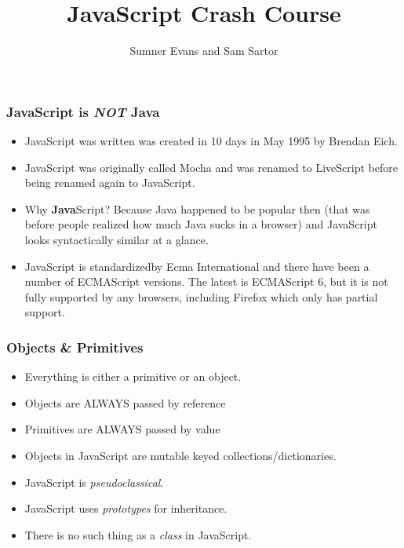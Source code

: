 \documentclass{lug}
\title{JavaScript Crash Course}
\author{Sumner Evans and Sam Sartor}
\begin{document}
\begin{frame}
    \frametitle{JavaScript is \textbf{\textit{NOT}} Java \footnotemark[1]}

    \begin{itemize}[<+->]
        \item JavaScript was written was created in 10 days in May 1995 by Brendan Eich.
        \item JavaScript was originally called Mocha and was renamed to LiveScript before being
            renamed again to JavaScript.
        \item Why \textbf{Java}Script? Because Java happened to be popular then (that was before
            people realized how much Java sucks in a browser) and JavaScript looks syntactically
            similar at a glance.
        \item JavaScript is standardized\footnotemark[2] by Ecma International and there have been a
            number of ECMAScript versions. The latest is ECMAScript 6, but it is not fully supported
            by any browsers, including Firefox which only has partial support.
    \end{itemize}

\end{frame}

\begin{frame}
    \frametitle{Objects \& Primitives}

    \begin{itemize}[<+->]
        \item Everything is either a primitive or an object.
        \item Objects are ALWAYS passed by reference
        \item Primitives are ALWAYS passed by value
        \item Objects in JavaScript are mutable keyed collections/dictionaries.
        \item JavaScript is \textit{pseudoclassical}.
        \item JavaScript uses \textit{prototypes} for inheritance.
        \item There is no such thing as a \textit{class} in JavaScript.\footnotemark[1]
    \end{itemize}

\end{frame}
\end{document}
